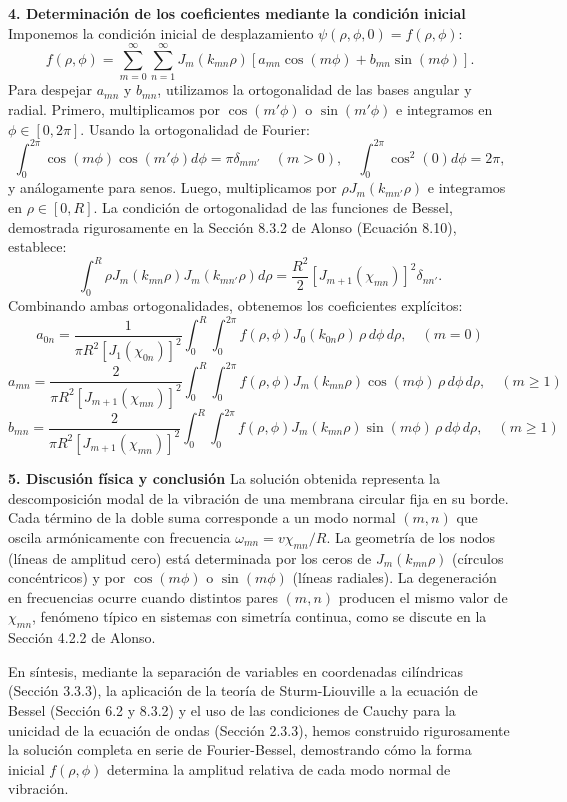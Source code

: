 \documentclass[a4paper]{article}
\begin{document}
\textbf{4. Determinación de los coeficientes mediante la condición inicial}
Imponemos la condición inicial de desplazamiento $\psi(\rho, \phi, 0) = f(\rho, \phi)$:
$$f(\rho, \phi) = \sum_{m=0}^{\infty} \sum_{n=1}^{\infty} J_m(k_{mn} \rho) \left[ a_{mn} \cos(m\phi) + b_{mn} \sin(m\phi) \right].$$
Para despejar $a_{mn}$ y $b_{mn}$, utilizamos la ortogonalidad de las bases angular y radial. Primero, multiplicamos por $\cos(m'\phi)$ o $\sin(m'\phi)$ e integramos en $\phi \in [0, 2\pi]$. Usando la ortogonalidad de Fourier:
$$\int_0^{2\pi} \cos(m\phi) \cos(m'\phi) d\phi = \pi \delta_{mm'} \quad (m>0), \quad \int_0^{2\pi} \cos^2(0) d\phi = 2\pi,$$
y análogamente para senos. Luego, multiplicamos por $\rho J_m(k_{mn'} \rho)$ e integramos en $\rho \in [0, R]$. La condición de ortogonalidad de las funciones de Bessel, demostrada rigurosamente en la Sección 8.3.2 de Alonso (Ecuación 8.10), establece:
$$\int_0^R \rho J_m(k_{mn} \rho) J_m(k_{mn'} \rho) d\rho = \frac{R^2}{2} \left[ J_{m+1}(\chi_{mn}) \right]^2 \delta_{nn'}.$$
Combinando ambas ortogonalidades, obtenemos los coeficientes explícitos:
$$a_{0n} = \frac{1}{\pi R^2 [J_1(\chi_{0n})]^2} \int_0^R \int_0^{2\pi} f(\rho, \phi) J_0(k_{0n} \rho) \, \rho \, d\phi \, d\rho, \quad (m=0)$$
$$a_{mn} = \frac{2}{\pi R^2 [J_{m+1}(\chi_{mn})]^2} \int_0^R \int_0^{2\pi} f(\rho, \phi) J_m(k_{mn} \rho) \cos(m\phi) \, \rho \, d\phi \, d\rho, \quad (m \ge 1)$$
$$b_{mn} = \frac{2}{\pi R^2 [J_{m+1}(\chi_{mn})]^2} \int_0^R \int_0^{2\pi} f(\rho, \phi) J_m(k_{mn} \rho) \sin(m\phi) \, \rho \, d\phi \, d\rho, \quad (m \ge 1)$$

\textbf{5. Discusión física y conclusión}
La solución obtenida representa la descomposición modal de la vibración de una membrana circular fija en su borde. Cada término de la doble suma corresponde a un modo normal $(m,n)$ que oscila armónicamente con frecuencia $\omega_{mn} = v \chi_{mn}/R$. La geometría de los nodos (líneas de amplitud cero) está determinada por los ceros de $J_m(k_{mn}\rho)$ (círculos concéntricos) y por $\cos(m\phi)$ o $\sin(m\phi)$ (líneas radiales). La degeneración en frecuencias ocurre cuando distintos pares $(m,n)$ producen el mismo valor de $\chi_{mn}$, fenómeno típico en sistemas con simetría continua, como se discute en la Sección 4.2.2 de Alonso. 

En síntesis, mediante la separación de variables en coordenadas cilíndricas (Sección 3.3.3), la aplicación de la teoría de Sturm-Liouville a la ecuación de Bessel (Sección 6.2 y 8.3.2) y el uso de las condiciones de Cauchy para la unicidad de la ecuación de ondas (Sección 2.3.3), hemos construido rigurosamente la solución completa en serie de Fourier-Bessel, demostrando cómo la forma inicial $f(\rho,\phi)$ determina la amplitud relativa de cada modo normal de vibración.
\end{document}
